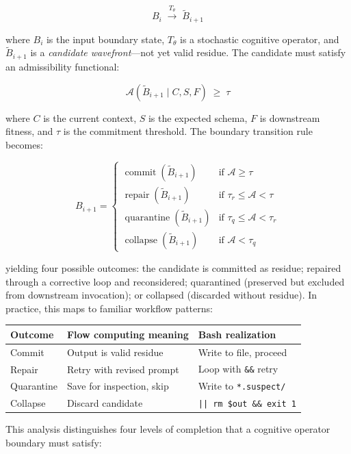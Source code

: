 \documentclass[12pt, a4paper]{article}
\begin{document}
\[
B_i \;\xrightarrow{T_\theta}\; \tilde{B}_{i+1}
\]

where $B_i$ is the input boundary state, $T_\theta$ is a
stochastic cognitive operator, and $\tilde{B}_{i+1}$ is a
\emph{candidate wavefront}---not yet valid residue. The
candidate must satisfy an admissibility functional:

\[
\mathcal{A}\!\left(\tilde{B}_{i+1} \mid C, S, F\right) \;\geq\; \tau
\]

where $C$ is the current context, $S$ is the expected schema,
$F$ is downstream fitness, and $\tau$ is the commitment
threshold. The boundary transition rule becomes:

\[
B_{i+1} =
\begin{cases}
\operatorname{commit}(\tilde{B}_{i+1})
  & \text{if } \mathcal{A} \geq \tau \\[4pt]
\operatorname{repair}(\tilde{B}_{i+1})
  & \text{if } \tau_r \leq \mathcal{A} < \tau \\[4pt]
\operatorname{quarantine}(\tilde{B}_{i+1})
  & \text{if } \tau_q \leq \mathcal{A} < \tau_r \\[4pt]
\operatorname{collapse}(\tilde{B}_{i+1})
  & \text{if } \mathcal{A} < \tau_q
\end{cases}
\]

yielding four possible outcomes: the candidate is committed as
residue; repaired through a corrective loop and reconsidered;
quarantined (preserved but excluded from downstream invocation);
or collapsed (discarded without residue). In practice, this maps
to familiar workflow patterns:

\begin{center}
\begin{tabular}{lll}
\textbf{Outcome} & \textbf{Flow computing meaning} & \textbf{Bash realization} \\
\hline
Commit & Output is valid residue & Write to file, proceed \\
Repair & Retry with revised prompt & Loop with \texttt{\&\&} retry \\
Quarantine & Save for inspection, skip & Write to \texttt{*.suspect/} \\
Collapse & Discard candidate & \texttt{|| rm \$out \&\& exit 1} \\
\end{tabular}
\end{center}

This analysis distinguishes four levels of completion that
a cognitive operator boundary must satisfy:
\end{document}
